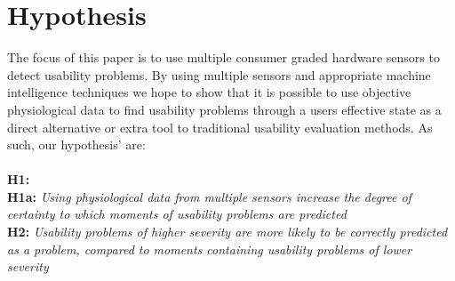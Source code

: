 \section{Hypothesis}
The focus of this paper is to use multiple consumer graded hardware sensors to detect usability problems. 
By using multiple sensors and appropriate machine intelligence techniques we hope to show that it is possible to use objective physiological data to find usability problems through a users effective state as a direct alternative or extra tool to traditional usability evaluation methods. 
As such, our hypothesis' are:\\\\

\newcommand{\hypo}[2]{%
  \textbf{H#1:} \textit{#2} \\
}
\hypo{1}{}

\hypo{1a}{Using physiological data from multiple sensors increase the degree of certainty to which moments of usability problems are predicted}

\hypo{2}{Usability problems of higher severity are more likely to be correctly predicted as a problem, compared to
moments containing usability problems of lower severity}


